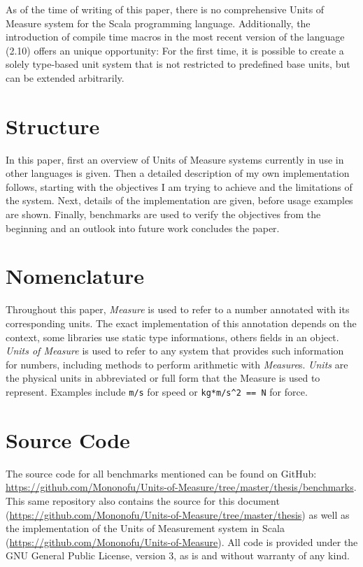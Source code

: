 \documentclass[12pt,oneside,a4paper]{scrbook}
\begin{document}
As of the time of writing of this paper, there is no comprehensive Units of Measure system for the Scala programming language. Additionally, the introduction of compile time macros in the most recent version of the language (2.10) offers an unique opportunity: For the first time, it is possible to create a solely type-based unit system that is not restricted to predefined base units, but can be extended arbitrarily.


\section{Structure}
In this paper, first an overview of Units of Measure systems currently in use in other languages is given. Then a detailed description of my own implementation follows, starting with the objectives I am trying to achieve and the limitations of the system. Next, details of the implementation are given, before usage examples are shown. Finally, benchmarks are used to verify the objectives from the beginning and an outlook into future work concludes the paper.


\section{Nomenclature}
Throughout this paper, \emph{Measure} is used to refer to a number annotated with its corresponding units. The exact implementation of this annotation depends on the context, some libraries use static type informations, others fields in an object. \emph{Units of Measure} is used to refer to any system that provides such information for numbers, including methods to perform arithmetic with \emph{Measure}s. \emph{Units} are the physical units in abbreviated or full form that the Measure is used to represent. Examples include \verb|m/s| for speed or \verb|kg*m/s^2 == N| for force.


\section{Source Code}
The source code for all benchmarks mentioned can be found on GitHub: \url{https://github.com/Mononofu/Units-of-Measure/tree/master/thesis/benchmarks}. This same repository also contains the source for this document (\url{https://github.com/Mononofu/Units-of-Measure/tree/master/thesis}) as well as the implementation of the Units of Measurement system in Scala (\url{https://github.com/Mononofu/Units-of-Measure}). All code is provided under the GNU General Public License, version 3, as is and without warranty of any kind.
\end{document}
